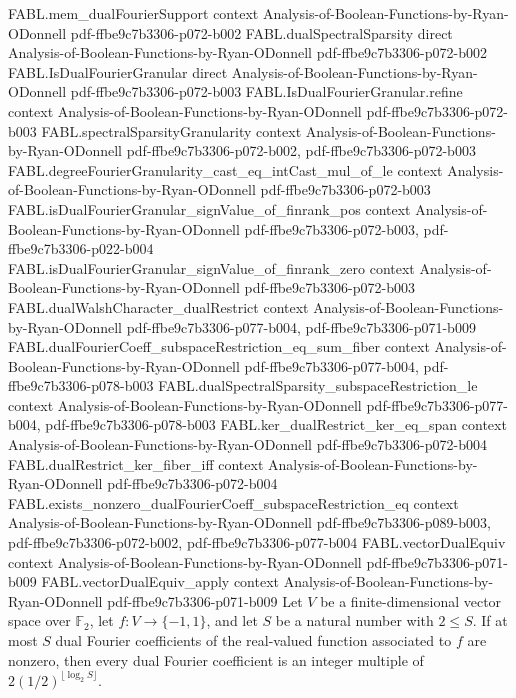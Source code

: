 \begin{theorem}
\proofstep
  {FABL.mem_dualFourierSupport}
  {context}
  {Analysis-of-Boolean-Functions-by-Ryan-ODonnell}
  {pdf-ffbe9c7b3306-p072-b002}
\proofstep
  {FABL.dualSpectralSparsity}
  {direct}
  {Analysis-of-Boolean-Functions-by-Ryan-ODonnell}
  {pdf-ffbe9c7b3306-p072-b002}
\proofstep
  {FABL.IsDualFourierGranular}
  {direct}
  {Analysis-of-Boolean-Functions-by-Ryan-ODonnell}
  {pdf-ffbe9c7b3306-p072-b003}
\proofstep
  {FABL.IsDualFourierGranular.refine}
  {context}
  {Analysis-of-Boolean-Functions-by-Ryan-ODonnell}
  {pdf-ffbe9c7b3306-p072-b003}
\proofstep
  {FABL.spectralSparsityGranularity}
  {context}
  {Analysis-of-Boolean-Functions-by-Ryan-ODonnell}
  {pdf-ffbe9c7b3306-p072-b002,
    pdf-ffbe9c7b3306-p072-b003}
\proofstep
  {FABL.degreeFourierGranularity_cast_eq_intCast_mul_of_le}
  {context}
  {Analysis-of-Boolean-Functions-by-Ryan-ODonnell}
  {pdf-ffbe9c7b3306-p072-b003}
\proofstep
  {FABL.isDualFourierGranular_signValue_of_finrank_pos}
  {context}
  {Analysis-of-Boolean-Functions-by-Ryan-ODonnell}
  {pdf-ffbe9c7b3306-p072-b003,
    pdf-ffbe9c7b3306-p022-b004}
\proofstep
  {FABL.isDualFourierGranular_signValue_of_finrank_zero}
  {context}
  {Analysis-of-Boolean-Functions-by-Ryan-ODonnell}
  {pdf-ffbe9c7b3306-p072-b003}
\proofstep
  {FABL.dualWalshCharacter_dualRestrict}
  {context}
  {Analysis-of-Boolean-Functions-by-Ryan-ODonnell}
  {pdf-ffbe9c7b3306-p077-b004,
    pdf-ffbe9c7b3306-p071-b009}
\proofstep
  {FABL.dualFourierCoeff_subspaceRestriction_eq_sum_fiber}
  {context}
  {Analysis-of-Boolean-Functions-by-Ryan-ODonnell}
  {pdf-ffbe9c7b3306-p077-b004,
    pdf-ffbe9c7b3306-p078-b003}
\proofstep
  {FABL.dualSpectralSparsity_subspaceRestriction_le}
  {context}
  {Analysis-of-Boolean-Functions-by-Ryan-ODonnell}
  {pdf-ffbe9c7b3306-p077-b004,
    pdf-ffbe9c7b3306-p078-b003}
\proofstep
  {FABL.ker_dualRestrict_ker_eq_span}
  {context}
  {Analysis-of-Boolean-Functions-by-Ryan-ODonnell}
  {pdf-ffbe9c7b3306-p072-b004}
\proofstep
  {FABL.dualRestrict_ker_fiber_iff}
  {context}
  {Analysis-of-Boolean-Functions-by-Ryan-ODonnell}
  {pdf-ffbe9c7b3306-p072-b004}
\proofstep
  {FABL.exists_nonzero_dualFourierCoeff_subspaceRestriction_eq}
  {context}
  {Analysis-of-Boolean-Functions-by-Ryan-ODonnell}
  {pdf-ffbe9c7b3306-p089-b003,
    pdf-ffbe9c7b3306-p072-b002,
    pdf-ffbe9c7b3306-p077-b004}
\proofstep
  {FABL.vectorDualEquiv}
  {context}
  {Analysis-of-Boolean-Functions-by-Ryan-ODonnell}
  {pdf-ffbe9c7b3306-p071-b009}
\proofstep
  {FABL.vectorDualEquiv_apply}
  {context}
  {Analysis-of-Boolean-Functions-by-Ryan-ODonnell}
  {pdf-ffbe9c7b3306-p071-b009}
Let $V$ be a finite-dimensional vector space over $\mathbb F_2$, let $f:V\to\{-1,1\}$,
and let $S$ be a natural number with $2\le S$. If at most $S$ dual Fourier coefficients
of the real-valued function associated to $f$ are nonzero, then every dual Fourier
coefficient is an integer multiple of $2(1/2)^{\lfloor\log_2 S\rfloor}$.
\end{theorem}

